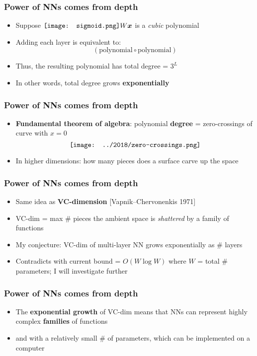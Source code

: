 \documentclass[17pt]{beamer}
\newcommand{\vect}[1]{\boldsymbol{#1}}
\newcommand*\sigmoid{\vcenter{\hbox{\texttt{[image: sigmoid.png]}}}}
\begin{document}
\begin{frame}
\frametitle{Power of NNs comes from depth}
\begin{itemize}
	\item Suppose $\sigmoid W \vect{x}$ is a \textit{cubic} polynomial
	\item Adding each layer is equivalent to:
	\begin{equation}
	 (\mbox{polynomial} \circ \mbox{polynomial})
	\end{equation}
	\item Thus, the resulting polynomial has total degree = $3^L$
	\item In other words, total degree grows  {\color{red}\textbf{exponentially}}
\end{itemize}
\end{frame}

\begin{frame}
\frametitle{Power of NNs comes from depth}
\begin{itemize}
	\item \textbf{Fundamental theorem of algebra}: polynomial \textbf{degree} = zero-crossings of curve with $x=0$
	\begin{equation}
	\vcenter{\hbox{\texttt{[image: ../2018/zero-crossings.png]}}}
	\end{equation}
	\item In higher dimensions: {\color{red}how many pieces} does a surface carve up the space
\end{itemize}
\end{frame}

\begin{frame}
\frametitle{Power of NNs comes from depth}
\begin{itemize}
	\item Same idea as \textbf{VC-dimension} [Vapnik–Chervonenkis 1971] 
	\item VC-dim = max \# pieces the ambient space is \textit{shattered} by a family of functions
	\item My conjecture: VC-dim of multi-layer NN grows exponentially as \# layers
	\item Contradicts with current bound = $O(W \log W)$ where $W$ = total \# parameters; I will investigate further
\end{itemize}
\end{frame}

\begin{frame}
\frametitle{Power of NNs comes from depth}
\begin{itemize}
	\item The {\color{red}\textbf{exponential growth}} of VC-dim means that NNs can represent highly complex \textbf{families} of functions
	\item and with a relatively small \# of parameters, which can be implemented on a computer
\end{itemize}
\end{frame}
\end{document}
